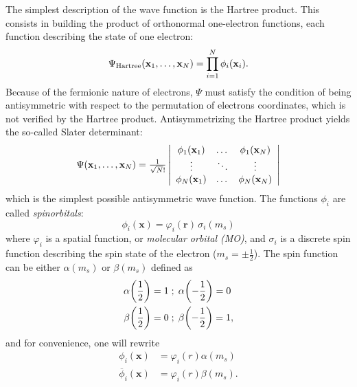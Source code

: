 \documentclass[./thesis.tex]{subfiles}
\begin{document}
The simplest description of the wave function is the Hartree product. This consists in 
building the product of orthonormal one-electron functions, each function describing the state of
one electron:
\begin{equation}
\Psi_{\text{Hartree}}({\bf x}_1,\dots,{\bf x}_{N})  = \prod_{i=1}^N \phi_i(\textbf{x}_i).
\end{equation}
Because of the fermionic nature of electrons, $\Psi$ must satisfy the condition of being antisymmetric with respect to the permutation of electrons coordinates, which is not verified by the Hartree product.
Antisymmetrizing the Hartree product yields the so-called Slater determinant:
\begin{equation}
\begin{array}{c}
 \Psi({\bf x}_1,\dots,{\bf x}_{N}) = 
\frac{1}{\sqrt{N}!} \left|
 \begin{array}{ccc}
 \phi_1({\bf x}_1) & \dots & \phi_1({\bf x}_{N}) \\
 \vdots              & \ddots &   \vdots             \\
 \phi_{N}({\bf x}_1) & \dots & \phi_N({\bf x}_{N}) \\
 \end{array}
\right| \\ 
\end{array} 
\label{eq:slater1}
\end{equation}
which is the simplest possible antisymmetric wave function.
The functions $\phi_i$ are called \emph{spinorbitals}:
\begin{equation}
\phi_i(\textbf{x}) = \varphi_i(\textbf{r}) \, \sigma_i(m_s)
\end{equation}
where $\varphi_i$ is a spatial function, or \emph{molecular orbital (MO)}, and $\sigma_i$ is a
discrete spin function describing the spin state of the electron ($m_s = \pm \frac{1}{2}$). The spin
function can be either $\alpha(m_s)$ or $\beta(m_s)$ defined as
\begin{align}
\alpha \qty(\frac{1}{2}) = 1  \; &; \;  \alpha \qty(-\frac{1}{2}) = 0   \\ \nonumber
\beta  \qty(\frac{1}{2}) = 0  \; &; \;  \beta  \qty(-\frac{1}{2}) = 1,
\end{align}
and for convenience, one will rewrite
\begin{align}
\phi_i(\textbf{x}) & = \varphi_i(r) \alpha(m_s) \\ \nonumber
\overline{\phi}_i(\textbf{x}) & = \varphi_i(r) \beta(m_s).
\end{align}
\end{document}
